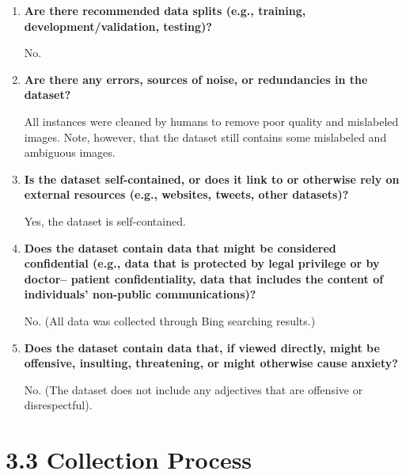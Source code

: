 \documentclass[a4paper,12pt]{article}
\begin{document}
\begin{enumerate}
    \item \textbf{Are there recommended data splits (e.g., training, development/validation,
    testing)?}

    No.

    \item \textbf{Are there any errors, sources of noise, or redundancies in the
    dataset?}

    All instances were cleaned by humans to remove poor quality and mislabeled images. Note, however, that the dataset still contains some mislabeled and ambiguous images.    

    \item \textbf{Is the dataset self-contained, or does it link to or otherwise rely on
    external resources (e.g., websites, tweets, other datasets)?}

    Yes, the dataset is self-contained.

    \item \textbf{Does the dataset contain data that might be considered confidential (e.g., data that is protected by legal privilege or by doctor–
    patient confidentiality, data that includes the content of individuals’ non-public communications)? }

    No. (All data was collected through Bing searching results.)

    \item \textbf{Does the dataset contain data that, if viewed directly, might be offensive, insulting, threatening, or might otherwise cause anxiety?}
    
    No. (The dataset does not include any adjectives that are offensive or disrespectful).

\end{enumerate}

\section*{3.3 Collection Process}
\end{document}
